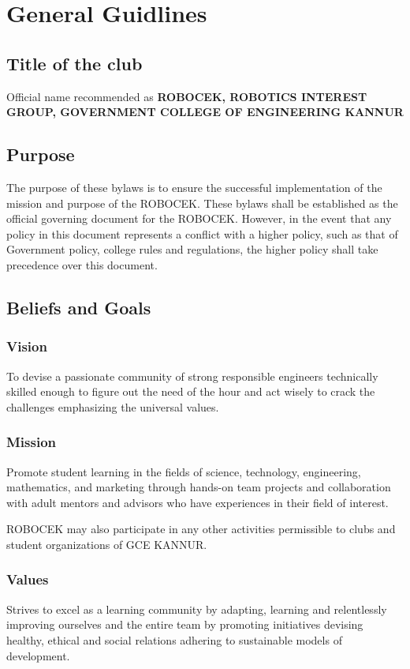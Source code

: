 \chapter{General Guidlines}

\section{Title of the club}
Official name recommended as \textbf{ROBOCEK, ROBOTICS INTEREST GROUP,
GOVERNMENT COLLEGE OF ENGINEERING KANNUR}


\section{Purpose}
The purpose of these bylaws is to ensure the successful implementation of the
mission and purpose of the ROBOCEK. These bylaws shall be established as
the official governing document for the ROBOCEK. However, in the event that
any policy in this document represents a conflict with a higher policy, such as that
of Government policy, college rules and regulations, the higher policy shall take
precedence over this document.


\section{Beliefs and Goals}
\subsection{Vision}
To devise a passionate community of strong responsible engineers technically skilled enough to figure out the need of the hour and act wisely to crack the challenges emphasizing the universal values.

\subsection{Mission}
Promote student learning in the fields of science, technology, engineering, mathematics, and marketing through hands-on team projects and collaboration with adult mentors and advisors who have experiences in their field of interest.
\par ROBOCEK may also participate in any other activities permissible to clubs and student organizations of GCE KANNUR.

\subsection{Values}
Strives to excel as a learning community by adapting, learning and relentlessly improving ourselves and the entire team by promoting initiatives devising healthy, ethical and social relations adhering to sustainable models of development.

